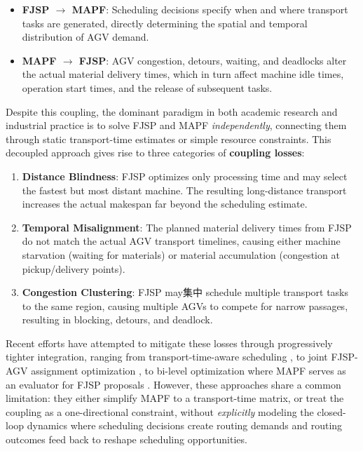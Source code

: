\documentclass[11pt,a4paper]{article}
\begin{document}
\begin{itemize}[leftmargin=*]
    \item \textbf{FJSP $\rightarrow$ MAPF}: Scheduling decisions specify when and where transport tasks are generated, directly determining the spatial and temporal distribution of AGV demand.
    \item \textbf{MAPF $\rightarrow$ FJSP}: AGV congestion, detours, waiting, and deadlocks alter the actual material delivery times, which in turn affect machine idle times, operation start times, and the release of subsequent tasks.
\end{itemize}

Despite this coupling, the dominant paradigm in both academic research and industrial practice is to solve FJSP and MAPF \emph{independently}, connecting them through static transport-time estimates or simple resource constraints. This decoupled approach gives rise to three categories of \textbf{coupling losses}:

\begin{enumerate}[leftmargin=*]
    \item \textbf{Distance Blindness}: FJSP optimizes only processing time and may select the fastest but most distant machine. The resulting long-distance transport increases the actual makespan far beyond the scheduling estimate.
    \item \textbf{Temporal Misalignment}: The planned material delivery times from FJSP do not match the actual AGV transport timelines, causing either machine starvation (waiting for materials) or material accumulation (congestion at pickup/delivery points).
    \item \textbf{Congestion Clustering}: FJSP may集中 schedule multiple transport tasks to the same region, causing multiple AGVs to compete for narrow passages, resulting in blocking, detours, and deadlock.
\end{enumerate}

Recent efforts have attempted to mitigate these losses through progressively tighter integration, ranging from transport-time-aware scheduling \citep{ref1}, to joint FJSP-AGV assignment optimization \citep{ref2}, to bi-level optimization where MAPF serves as an evaluator for FJSP proposals \citep{ref3}. However, these approaches share a common limitation: they either simplify MAPF to a transport-time matrix, or treat the coupling as a one-directional constraint, without \emph{explicitly} modeling the closed-loop dynamics where scheduling decisions create routing demands and routing outcomes feed back to reshape scheduling opportunities.
\end{document}
